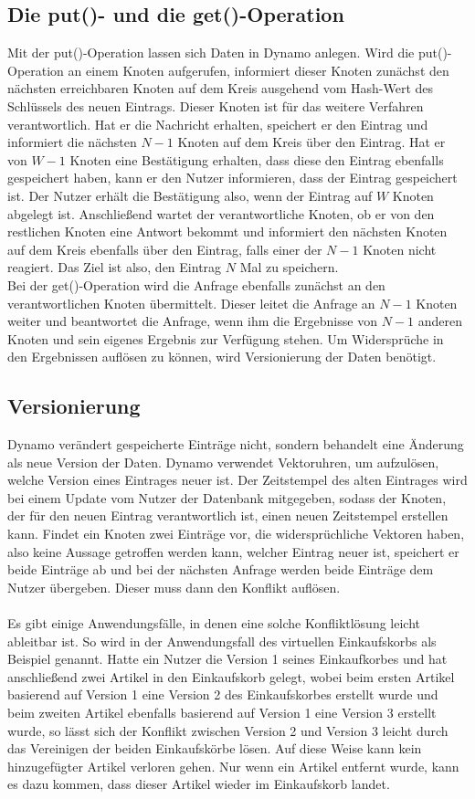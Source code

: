 \subsection{Die put()- und die get()-Operation}
Mit der put()-Operation lassen sich Daten in Dynamo anlegen. Wird die put()-Operation an einem Knoten aufgerufen, informiert dieser Knoten zunächst den nächsten erreichbaren Knoten auf dem Kreis ausgehend vom Hash-Wert des Schlüssels des neuen Eintrags. Dieser Knoten ist für das weitere Verfahren verantwortlich. Hat er die Nachricht erhalten, speichert er den Eintrag und informiert die nächsten $N-1$ Knoten auf dem Kreis über den Eintrag. Hat er von $W-1$ Knoten eine Bestätigung erhalten, dass diese den Eintrag ebenfalls gespeichert haben, kann er den Nutzer informieren, dass der Eintrag gespeichert ist. Der Nutzer erhält die Bestätigung also, wenn der Eintrag auf $W$ Knoten abgelegt ist. Anschließend wartet der verantwortliche Knoten, ob er von den restlichen Knoten eine Antwort bekommt und informiert den nächsten Knoten auf dem Kreis ebenfalls über den Eintrag, falls einer der $N-1$ Knoten nicht reagiert. Das Ziel ist also, den Eintrag $N$ Mal zu speichern. \\
Bei der get()-Operation wird die Anfrage ebenfalls zunächst an den verantwortlichen Knoten übermittelt. Dieser leitet die Anfrage an $N-1$ Knoten weiter und beantwortet die Anfrage, wenn ihm die Ergebnisse von $N-1$ anderen Knoten und sein eigenes Ergebnis zur Verfügung stehen. Um Widersprüche in den Ergebnissen auflösen zu können, wird Versionierung der Daten benötigt.
\subsection{Versionierung}
Dynamo verändert gespeicherte Einträge nicht, sondern behandelt eine Änderung als neue Version der Daten. Dynamo verwendet Vektoruhren, um aufzulösen, welche Version eines Eintrages neuer ist. Der Zeitstempel des alten Eintrages wird bei einem Update vom Nutzer der Datenbank mitgegeben, sodass der Knoten, der für den neuen Eintrag verantwortlich ist, einen neuen Zeitstempel erstellen kann. Findet ein Knoten zwei Einträge vor, die widersprüchliche Vektoren haben, also keine Aussage getroffen werden kann, welcher Eintrag neuer ist, speichert er beide Einträge ab und bei der nächsten Anfrage werden beide Einträge dem Nutzer übergeben. Dieser muss dann den Konflikt auflösen. \\
\\
Es gibt einige Anwendungsfälle, in denen eine solche Konfliktlösung leicht ableitbar ist. So wird in \cite{dynamo} der Anwendungsfall des virtuellen Einkaufskorbs als Beispiel genannt. Hatte ein Nutzer die Version 1 seines Einkaufkorbes und hat anschließend zwei Artikel in den Einkaufskorb gelegt, wobei beim ersten Artikel basierend auf Version 1 eine Version 2 des Einkaufskorbes erstellt wurde und beim zweiten Artikel ebenfalls basierend auf Version 1 eine Version 3 erstellt wurde, so lässt sich der Konflikt zwischen Version 2 und Version 3 leicht durch das Vereinigen der beiden Einkaufskörbe lösen. Auf diese Weise kann kein hinzugefügter Artikel verloren gehen. Nur wenn ein Artikel entfernt wurde, kann es dazu kommen, dass dieser Artikel wieder im Einkaufskorb landet.
